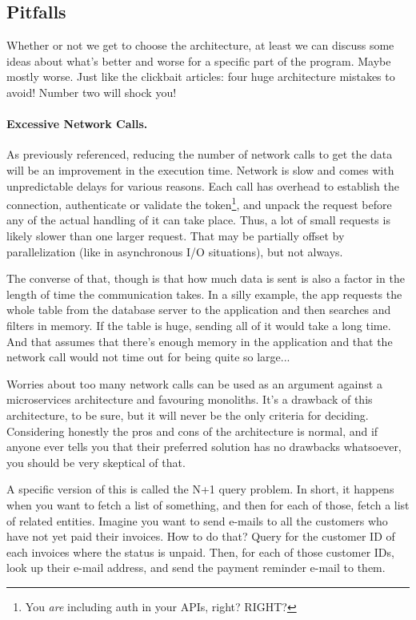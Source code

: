 \subsection*{Pitfalls}

Whether or not we get to choose the architecture, at least we can discuss some ideas about what's better and worse for a specific part of the program. Maybe mostly worse. Just like the clickbait articles: four huge architecture mistakes to avoid! Number two will shock you! 

\paragraph{Excessive Network Calls.}
As previously referenced, reducing the number of network calls to get the data will be an improvement in the execution time. Network is slow and comes with unpredictable delays for various reasons. Each call has overhead to establish the connection, authenticate or validate the token\footnote{You \textit{are} including auth in your APIs, right? RIGHT?}, and unpack the request before any of the actual handling of it can take place. Thus, a lot of small requests is likely slower than one larger request. That may be partially offset by parallelization (like in asynchronous I/O situations), but not always.

The converse of that, though is that how much data is sent is also a factor in the length of time the communication takes. In a silly example, the app requests the whole table from the database server to the application and then searches and filters in memory. If the table is huge, sending all of it would take a long time. And that assumes that there's enough memory in the application and that the network call would not time out for being quite so large...

Worries about too many network calls can be used as an argument against a microservices architecture and favouring monoliths. It's a drawback of this architecture, to be sure, but it will never be the only criteria for deciding. Considering honestly the pros and cons of the architecture is normal, and if anyone ever tells you that their preferred solution has no drawbacks whatsoever, you should be very skeptical of that.

A specific version of this is called the N+1 query problem. In short, it happens when you want to fetch a list of something, and then for each of those, fetch a list of related entities. Imagine you want to send e-mails to all the customers who have not yet paid their invoices. How to do that? Query for the customer ID of each invoices where the status is unpaid. Then, for each of those customer IDs, look up their e-mail address, and send the payment reminder e-mail to them.

